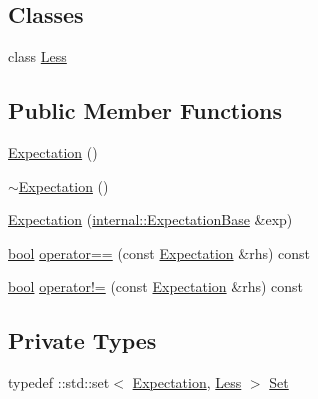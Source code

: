 \subsection*{Classes}
\begin{DoxyCompactItemize}
\item 
class \hyperlink{classtesting_1_1Expectation_1_1Less}{Less}
\end{DoxyCompactItemize}
\subsection*{Public Member Functions}
\begin{DoxyCompactItemize}
\item 
\hyperlink{classtesting_1_1Expectation_a10b4bb1252356ec9224ca93124827184}{Expectation} ()
\item 
\hyperlink{classtesting_1_1Expectation_a7a5c0a19222bb2f1eaff1906f853eed4}{$\sim$\+Expectation} ()
\item 
\hyperlink{classtesting_1_1Expectation_a58e0c78b0f47365ac058be117fea655c}{Expectation} (\hyperlink{classtesting_1_1internal_1_1ExpectationBase}{internal\+::\+Expectation\+Base} \&exp)
\item 
\hyperlink{classbool}{bool} \hyperlink{classtesting_1_1Expectation_a319f0eea03bd4e6dd0000306fb2ed6ca}{operator==} (const \hyperlink{classtesting_1_1Expectation}{Expectation} \&rhs) const
\item 
\hyperlink{classbool}{bool} \hyperlink{classtesting_1_1Expectation_a65d348ba9164e204feed37be93f655b0}{operator!=} (const \hyperlink{classtesting_1_1Expectation}{Expectation} \&rhs) const
\end{DoxyCompactItemize}
\subsection*{Private Types}
\begin{DoxyCompactItemize}
\item 
typedef \+::std\+::set$<$ \hyperlink{classtesting_1_1Expectation}{Expectation}, \hyperlink{classtesting_1_1Expectation_1_1Less}{Less} $>$ \hyperlink{classtesting_1_1Expectation_a775955d57763c85daa8fda4b28ee2393}{Set}
\end{DoxyCompactItemize}
